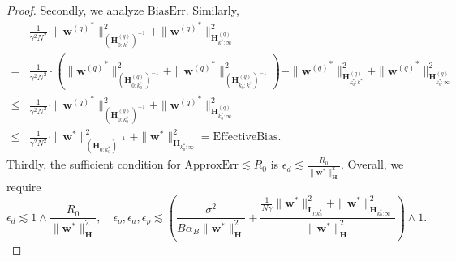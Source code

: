 \documentclass[11pt, letterpaper]{article}
\begin{document}
\begin{proof}
    Secondly, we analyze $\mathrm{BiasErr}$. Similarly,
    \begin{equation}
        \label{eq: d1}
        \begin{aligned}
            & \frac{1}{\gamma^2N^2}\cdot\|{\mathbf{w}^{(q)}}^*\|_{(\mathbf{H}_{0:k^*}^{(q)})^{-1}}^2+\|{\mathbf{w}^{(q)}}^*\|_{\mathbf{H}_{k^*:\infty}^{(q)}}^2\\
            =&\frac{1}{\gamma^2N^2}\cdot\left(\|{\mathbf{w}^{(q)}}^*\|_{(\mathbf{H}_{0:k_0^*}^{(q)})^{-1}}^2+\|{\mathbf{w}^{(q)}}^*\|_{(\mathbf{H}_{k_0^*:k^*}^{(q)})^{-1}}^2\right)-\|{\mathbf{w}^{(q)}}^*\|_{\mathbf{H}_{k_0^*:k^*}^{(q)}}^2+\|{\mathbf{w}^{(q)}}^*\|_{\mathbf{H}_{k_0^*:\infty}^{(q)}}^2\\
            \leq &\frac{1}{\gamma^2N^2}\cdot\|{\mathbf{w}^{(q)}}^*\|_{(\mathbf{H}_{0:k_0^*}^{(q)})^{-1}}^2+\|{\mathbf{w}^{(q)}}^*\|_{\mathbf{H}_{k_0^*:\infty}^{(q)}}^2\\
            \leq&\frac{1}{\gamma^2N^2}\cdot\|{\mathbf{w}}^*\|_{(\mathbf{H}_{0:k_0^*})^{-1}}^2+\|{\mathbf{w}}^*\|_{\mathbf{H}_{k_0^*:\infty}}^2=\mathrm{EffectiveBias}.
        \end{aligned}
    \end{equation}
    Thirdly, the sufficient condition for $\mathrm{ApproxErr}\lesssim R_0$ is $\epsilon_d\lesssim \frac{R_0}{\|\mathbf{w}^*\|_{\mathbf{H}}^2}.$ Overall, we require
    \begin{equation*}
        \epsilon_d\lesssim 1\wedge \frac{R_0}{\|\mathbf{w}^*\|_{\mathbf{H}}^2},\quad\epsilon_o,\epsilon_a,\epsilon_p \lesssim  \left(\frac{\sigma^2}{B\alpha_B\|\mathbf{w}^*\|_\mathbf{H}^2}+\frac{\frac{1}{N\gamma}\|{\mathbf{w}}^*\|_{\mathbf{I}_{0:k_0^*}}^2+\|{\mathbf{w}}^*\|_{\mathbf{H}_{k_0^*:\infty}}^2}{\|\mathbf{w}^*\|_\mathbf{H}^2}\right)\wedge 1.
    \end{equation*}
\end{proof}
\end{document}
